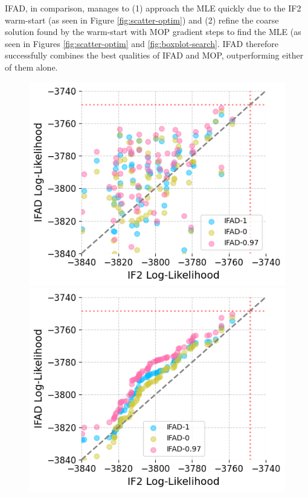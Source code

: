 \documentclass[9pt,twocolumn,twoside]{pnas-new}
\begin{document}
IFAD, in comparison, manages to (1) approach the MLE quickly due to the IF2 warm-start (as seen in Figure \ref{fig:scatter-optim}) and (2) refine the coarse solution found by the warm-start with MOP gradient steps to find the MLE (as seen in Figures \ref{fig:scatter-optim} and \ref{fig:boxplot-search}. IFAD therefore successfully combines the best qualities of IFAD and MOP, outperforming either of them alone. 


\begin{figure}[htbp!]
    \includegraphics[width=\textwidth/\real{4.2}]{../imgs/095/pairs.png}
    \includegraphics[width=\textwidth/\real{4.2}]{../imgs/095/qq.png}

\end{figure}
\end{document}
